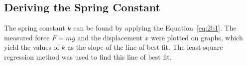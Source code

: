 







\subsection{Deriving the Spring Constant}



The spring constant $k$ can be found by applying the Equation~\eqref{eq:2b1}. The measured force $F=mg$ and the displacement $x$ were plotted on graphs, which yield the values of $k$ as the slope of the line of best fit. The least-square regression method was used to find this line of best fit.



%     
%     

